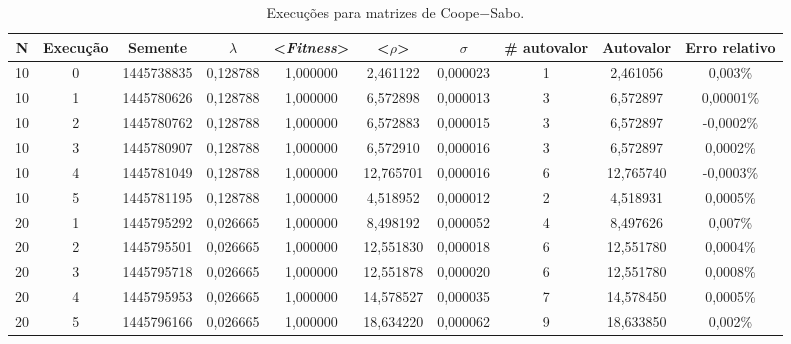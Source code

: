 \begin{landscape}
\begin{center}
\begin{table}[htbp]
\caption{Execuções para matrizes de Coope$-$Sabo.}
\label{tab:execucoes10a40}
\begin{tabular}{cccccccccc}
\hline \hline
   \textbf{N} & \textbf{Execução} & \textbf{Semente} & \textbf{$\lambda$} & \textbf{<\textit{Fitness}>} & \textbf{<$\rho$>} & \textbf{$\sigma$} & \textbf{\# autovalor} & \textbf{Autovalor} & \textbf{Erro relativo} \\
\hline \hline
        10 &          0 & 1445738835 &   0,128788 &   1,000000 &   2,461122 &   0,000023 &          1 &   2,461056 &    0,003\% \\
\hline
        10 &          1 & 1445780626 &   0,128788 &   1,000000 &   6,572898 &   0,000013 &          3 &   6,572897 &  0,00001\% \\
\hline
        10 &          2 & 1445780762 &   0,128788 &   1,000000 &   6,572883 &   0,000015 &          3 &   6,572897 &  -0,0002\% \\
\hline
        10 &          3 & 1445780907 &   0,128788 &   1,000000 &   6,572910 &   0,000016 &          3 &   6,572897 &   0,0002\% \\
\hline
        10 &          4 & 1445781049 &   0,128788 &   1,000000 &  12,765701 &   0,000016 &          6 &  12,765740 &  -0,0003\% \\
\hline
        10 &          5 & 1445781195 &   0,128788 &   1,000000 &   4,518952 &   0,000012 &          2 &   4,518931 &   0,0005\% \\
\hline
        20 &          1 & 1445795292 &   0,026665 &   1,000000 &   8,498192 &   0,000052 &          4 &   8,497626 &    0,007\% \\
\hline
        20 &          2 & 1445795501 &   0,026665 &   1,000000 &  12,551830 &   0,000018 &          6 &  12,551780 &   0,0004\% \\
\hline
        20 &          3 & 1445795718 &   0,026665 &   1,000000 &  12,551878 &   0,000020 &          6 &  12,551780 &   0,0008\% \\
\hline
        20 &          4 & 1445795953 &   0,026665 &   1,000000 &  14,578527 &   0,000035 &          7 &  14,578450 &   0,0005\% \\
\hline
        20 &          5 & 1445796166 &   0,026665 &   1,000000 &  18,634220 &   0,000062 &          9 &  18,633850 &    0,002\% \\

\end{tabular}
\end{table}
\end{center}
\end{landscape}
